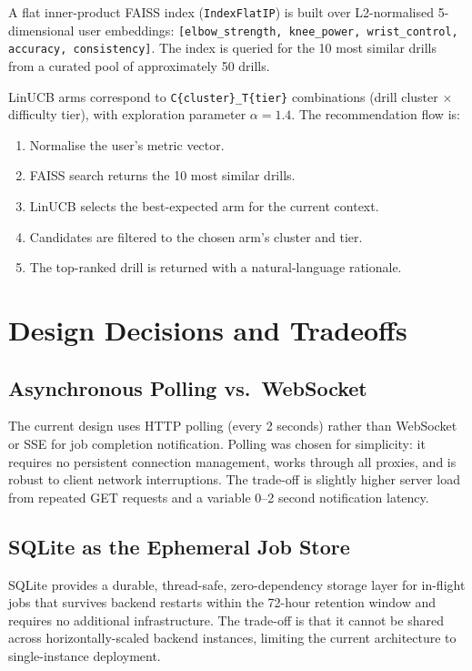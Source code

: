 A flat inner-product FAISS index (\lstinline|IndexFlatIP|) is built over L2-normalised 5-dimensional user embeddings: \lstinline|[elbow_strength, knee_power, wrist_control, accuracy, consistency]|. The index is queried for the 10 most similar drills from a curated pool of approximately 50 drills.

LinUCB arms correspond to \lstinline|C{cluster}_T{tier}| combinations (drill cluster $\times$ difficulty tier), with exploration parameter $\alpha = 1.4$. The recommendation flow is:

\begin{enumerate}
  \item Normalise the user's metric vector.
  \item FAISS search returns the 10 most similar drills.
  \item LinUCB selects the best-expected arm for the current context.
  \item Candidates are filtered to the chosen arm's cluster and tier.
  \item The top-ranked drill is returned with a natural-language rationale.
\end{enumerate}

\section{Design Decisions and Tradeoffs}
\label{sec:design_decisions}

\subsection{Asynchronous Polling vs.\ WebSocket}

The current design uses HTTP polling (every 2 seconds) rather than WebSocket or SSE for job completion notification. Polling was chosen for simplicity: it requires no persistent connection management, works through all proxies, and is robust to client network interruptions. The trade-off is slightly higher server load from repeated GET requests and a variable 0--2 second notification latency.

\subsection{SQLite as the Ephemeral Job Store}

SQLite provides a durable, thread-safe, zero-dependency storage layer for in-flight jobs that survives backend restarts within the 72-hour retention window and requires no additional infrastructure. The trade-off is that it cannot be shared across horizontally-scaled backend instances, limiting the current architecture to single-instance deployment.

